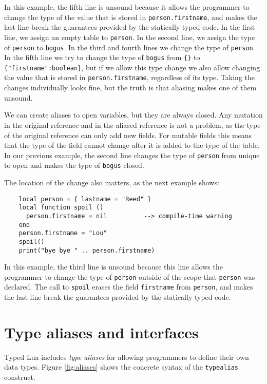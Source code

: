 In this example, the fifth line is unsound because it allows the
programmer to change the type of the value that is stored in
\texttt{person.firstname}, and makes the last line break the
guarantees provided by the statically typed code.
In the first line, we assign an empty table to \texttt{person}.
In the second line, we assign the type of \texttt{person} to
\texttt{bogus}.
In the third and fourth lines we change the type of \texttt{person}.
In the fifth line we try to change the type of \texttt{bogus}
from \texttt{\{\}} to \texttt{\{"firstname":boolean\}},
but if we allow this type change we also allow changing the value
that is stored in \texttt{person.firstname}, regardless of its type.
Taking the changes individually looks fine, but the truth is that
aliasing makes one of them unsound.

We can create aliases to open variables, but they are always closed.
Any mutation in the original reference and in the aliased reference
is not a problem, as the type of the original reference can only
add new fields.
For mutable fields this means that the type of the field cannot
change after it is added to the type of the table.
In our previous example, the second line changes the type of
\texttt{person} from unique to open and makes the type of
\texttt{bogus} closed.

The location of the change also matters, as the next example shows:
\begin{verbatim}
    local person = { lastname = "Reed" }
    local function spoil ()
      person.firstname = nil          --> compile-time warning
    end
    person.firstname = "Lou"
    spoil()
    print("bye bye " .. person.firstname)
\end{verbatim}

In this example, the third line is unsound because this line allows
the programmer to change the type of \texttt{person} outside of the
scope that \texttt{person} was declared.
The call to \texttt{spoil} erases the field \texttt{firstname} from
\texttt{person}, and makes the last line break the guarantees
provided by the statically typed code.

\section{Type aliases and interfaces}
\label{sec:alias}

Typed Lua includes \emph{type aliases} for allowing programmers to
define their own data types.
Figure \ref{fig:aliases} shows the concrete syntax of the
\texttt{typealias} construct.

